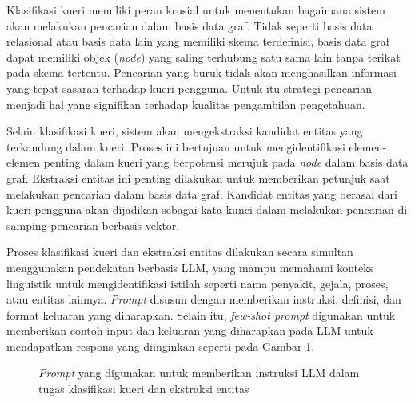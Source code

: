 Klasifikasi kueri memiliki peran krusial untuk menentukan bagaimana sistem akan melakukan pencarian dalam basis data graf.
Tidak seperti basis data relasional atau basis data lain yang memiliki skema terdefinisi, basis data graf dapat memiliki objek (\textit{node}) yang saling terhubung satu sama lain tanpa terikat pada skema tertentu.
Pencarian yang buruk tidak akan menghasilkan informasi yang tepat sasaran terhadap kueri pengguna.
Untuk itu strategi pencarian menjadi hal yang signifikan terhadap kualitas pengambilan pengetahuan.

Selain klasifikasi kueri, sistem akan mengekstraksi kandidat entitas yang terkandung dalam kueri.
Proses ini bertujuan untuk mengidentifikasi elemen-elemen penting dalam kueri yang berpotensi merujuk pada \textit{node} dalam basis data graf.
Ekstraksi entitas ini penting dilakukan untuk memberikan petunjuk saat melakukan pencarian dalam basis data graf.
Kandidat entitas yang berasal dari kueri pengguna akan dijadikan sebagai kata kunci dalam melakukan pencarian di samping pencarian berbasis vektor.

Proses klasifikasi kueri dan ekstraksi entitas dilakukan secara simultan menggunakan pendekatan berbasis LLM, yang mampu memahami konteks linguistik untuk mengidentifikasi istilah seperti nama penyakit, gejala, proses, atau entitas lainnya.
\textit{Prompt} disusun dengan memberikan instruksi, definisi, dan format keluaran yang diharapkan.
Selain itu, \textit{few-shot prompt} digunakan untuk memberikan contoh input dan keluaran yang diharapkan pada LLM untuk mendapatkan respons yang diinginkan seperti pada Gambar \ref{fig:prompt-query-classification-entity-extraction}.

\begin{figure}[H]
	\caption{\textit{Prompt} yang digunakan untuk memberikan instruksi LLM dalam tugas klasifikasi kueri dan ekstraksi entitas}
	\label{fig:prompt-query-classification-entity-extraction}
\end{figure}

